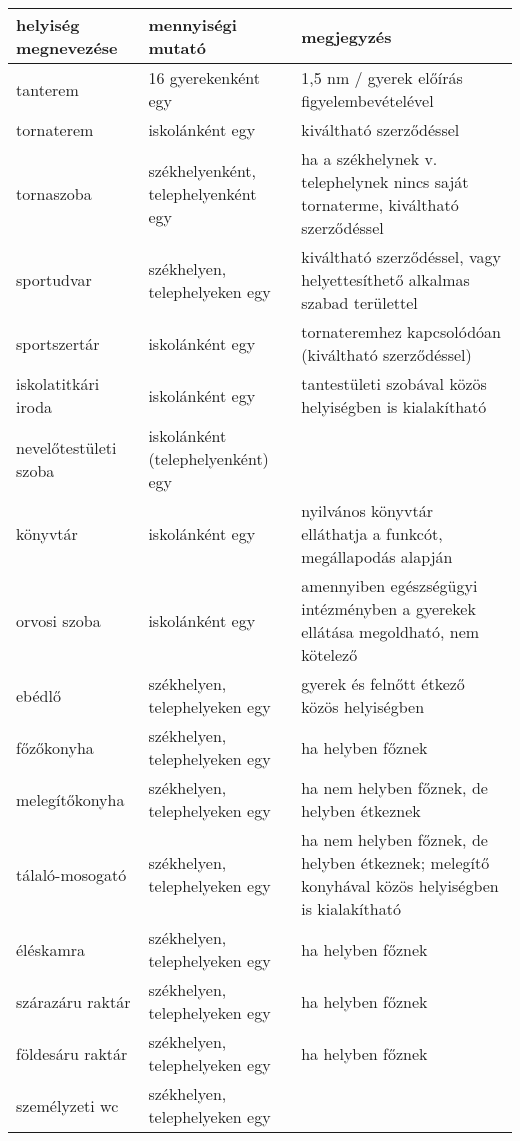 \begin{longtable}{@{}p{4cm}|p{4cm}|p{6cm}@{}}

    \textbf{helyiség megnevezése} & \textbf{mennyiségi mutató}
                                  & \textbf{megjegyzés}
    \\ \hline
    tanterem                      & 16 gyerekenként egy                 &
    1,5 nm /
    gyerek előírás figyelembevételével
    \\ \hline
    tornaterem                    & iskolánként egy                     &
    kiváltható
    szerződéssel
    \\ \hline
    tornaszoba                    & székhelyenként, telephelyenként egy &
    ha a
    székhelynek v. telephelynek nincs saját tornaterme, kiváltható szerződéssel
    \\ \hline
    sportudvar                    & székhelyen, telephelyeken egy       &
    kiváltható
    szerződéssel, vagy helyettesíthető alkalmas szabad területtel
    \\ \hline
    sportszertár                  & iskolánként egy                     &
    tornateremhez kapcsolódóan (kiváltható szerződéssel)
    \\ \hline
    iskolatitkári iroda           & iskolánként egy                     &
    tantestületi szobával közös helyiségben  is kialakítható
    \\ \hline
    nevelőtestületi szoba         & iskolánként (telephelyenként) egy   &

    \\ \hline
    könyvtár                      & iskolánként egy                     &
    nyilvános
    könyvtár elláthatja a funkcót, megállapodás alapján
    \\ \hline
    orvosi szoba                  & iskolánként egy                     &
    amennyiben
    egészségügyi intézményben a gyerekek ellátása megoldható, nem kötelező
    \\
    \hline
    ebédlő                        & székhelyen, telephelyeken egy       &
    gyerek és
    felnőtt étkező közös helyiségben
    \\ \hline
    főzőkonyha                    & székhelyen, telephelyeken egy       &
    ha helyben
    főznek
    \\ \hline
    melegítőkonyha                & székhelyen, telephelyeken egy       &
    ha nem
    helyben főznek, de helyben étkeznek
    \\ \hline
    tálaló-mosogató               & székhelyen, telephelyeken egy       &
    ha nem
    helyben főznek, de helyben étkeznek; melegítő konyhával közös helyiségben
    is
    kialakítható
    \\ \hline
    éléskamra                     & székhelyen, telephelyeken egy       &
    ha helyben
    főznek
    \\ \hline
    szárazáru raktár              & székhelyen, telephelyeken egy       &
    ha helyben
    főznek
    \\ \hline
    földesáru raktár              & székhelyen, telephelyeken egy       &
    ha helyben
    főznek
    \\ \hline
    személyzeti wc                & székhelyen, telephelyeken egy       &


\end{longtable}
